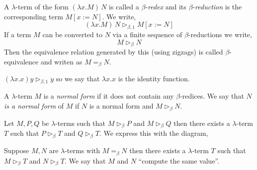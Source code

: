 \documentclass[12pt]{article}
\newcommand{\red}{\triangleright}
\newcommand{\bredo}{\red_{\beta,1}}
\newcommand{\bred}{\red_{\beta}}
\begin{document}
\begin{defn}
A $\lambda$-term of the form $(\lambda x.M) \, N$ is called a $\beta$-\textit{redex} and its $\beta$-\textit{reduction} is the corresponding term $M [x := N]$. We write,
\[ (\lambda x.M) \, N \bredo M [x := N] \]
If a term $M$ can be converted to $N$ via a finite sequence of $\beta$-reductions we write,
\[ M \bred N \]
Then the equivalence relation generated by this (using zigzags) is called $\beta$-equivalence and writen as $M =_\beta N$. 
\end{defn}

\begin{example}
$( \lambda x . x) y \bredo y$ so we say that $\lambda x . x$ is the identity function.
\end{example}

\begin{defn}
A $\lambda$-term $M$ is a \textit{normal form} if it does not contain any $\beta$-redices. We say that $N$ \textit{is a normal form} of $M$ if $N$ is a normal form and $M \bred N$.
\end{defn} 

\begin{theorem}
Let $M, P, Q$ be $\lambda$-terms such that $M \bred P$ and $M \bred Q$ then there exists a $\lambda$-term $T$ such that $P \bred T$ and $Q \bred T$. We express this with the diagram,
\begin{center}
\end{center}
\end{theorem} 

\begin{cor}
Suppose $M, N$ are $\lambda$-terms with $M =_\beta N$ then there exists a $\lambda$-term $T$ such that $M \bred T$ and $N \bred T$. We say that $M$ and $N$ ``compute the same value''.
\end{cor}
\end{document}
